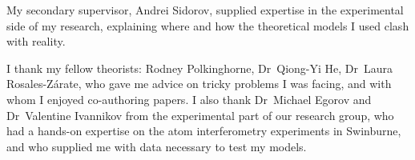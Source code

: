 My secondary supervisor, Andrei Sidorov, supplied expertise in the experimental side of my research, explaining where and how the theoretical models I used clash with reality.

I thank my fellow theorists: Rodney Polkinghorne, Dr~Qiong-Yi He, Dr~Laura Rosales-Z\'arate, who gave me advice on tricky problems I was facing, and with whom I enjoyed co-authoring papers.
I also thank Dr~Michael Egorov and Dr~Valentine Ivannikov from the experimental part of our research group, who had a hands-on expertise on the atom interferometry experiments in Swinburne, and who supplied me with data necessary to test my models.
